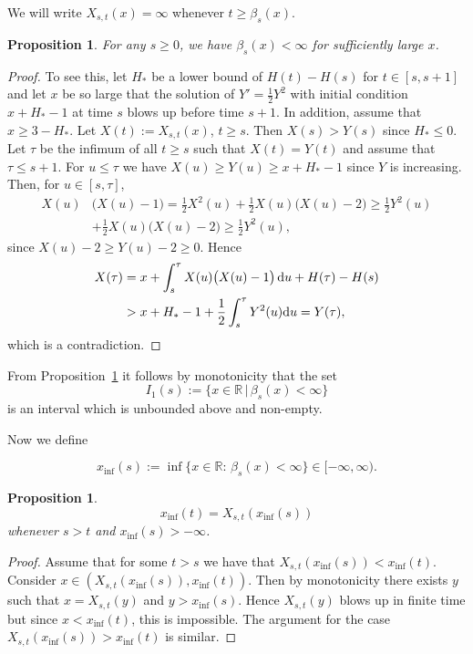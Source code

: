 \documentclass[sn-mathphys-num]{sn-jnl}
\newtheorem{prp}[thm]{Proposition}
\theoremstyle{definition}
\newcommand{\scr}[1]{\mathscr #1}
\numberwithin{equation}{section} \theoremstyle{remark}
\renewcommand{\d}{\hbox{d}}
\def\R{\mathbb R}
\def\d{\text{\rm{d}}} \def\bb{\beta} \def\aa{\alpha} \def\D{\scr D}
\newcommand{\1}{\mathbbm{1}}
\begin{document}
We will write $X_{s,t}(x)=\infty$ whenever $t \geq \beta_s(x)$.


\begin{prp}\label{bfinite}
  For any $s \geq 0$, we have $\beta_s(x)<\infty$ for sufficiently
  large $x$.
\end{prp}
\begin{proof}
  To see this, let $H_*$ be a lower bound of $H(t)-H(s)$ for
  $t \in [s,s+1]$ and let $x$ be so large that the solution of
  $Y'=\frac 12 Y^2$ with initial condition $x+H_*-1$ at time $s$ blows
  up before time $s+1$. In addition, assume that $x\geq 3-H_*$. Let
  $X(t):=X_{s ,t}(x)$, $t \geq s$. Then $X(s)> Y(s)$ since
  $H_*\leq 0$. Let $\tau$ be the infimum of all $t \geq s$ such that
  $X(t)=Y(t)$ and assume that $\tau \leq s+1$. For $u\leq \tau$ we
  have $X(u)\geq Y(u)\geq x+H_*-1$ since $Y$ is increasing.  Then, for
  $u \in [s,\tau]$,
\begin{align*}
X(u) & \big(X(u)-1\big)=\frac 12 X^2(u)+\frac 12
       X(u)\big(X(u)-2\big)\geq \frac 12 Y^2(u)\\
  & +\frac 12 X(u)\big(X(u)-2\big)\geq \frac 12 Y^2(u),
\end{align*}
since $X(u)-2\geq Y(u)-2 \geq 0$. Hence
\begin{align*}
  X(\tau) & =x+\int_s^\tau X(u)\big(X(u)-1\big)\,\d u +H(\tau)-H(s)\\
  & > x+H_* -1 +\frac 12 \int_
s^\tau Y^2(u)\d u =Y(\tau),
\end{align*}
which is a contradiction.
\end{proof}

From Proposition~\ref{bfinite} it follows by monotonicity that the set
\begin{equation} \label{I1s}
  I_1(s) := \{ x\in \R \, | \, \beta_s(x)<\infty\}
\end{equation}  
is an interval which is unbounded above and non-empty.



Now we define 

$$
x_{\inf}(s):=\inf\{x \in \R:\,\beta_s(x)<\infty\}\in [-\infty,\infty).
$$

\begin{prp}\label{Rsoln} 
  \[
    x_{\inf}(t) = X_{s,t} ( x_{\inf} (s) )
  \]
  whenever $s>t$ and $x_{\inf}(s)>-\infty$.  
\end{prp}

\begin{proof}
  Assume that for some $t > s$ we have that
  $ X_{s,t} ( x_{\inf} (s) ) < x_{\inf}(t)$. Consider
  $x \in ( X_{s,t} ( x_{\inf} (s) ), x_{\inf}(t))$. Then by
  monotonicity there exists $y$ such that $x=X_{s,t}(y)$ and
  $y> x_{\inf}(s)$. Hence $X_{s,t}(y)$ blows up in finite time but
  since $x < x_{\inf}(t)$, this is impossible. The argument for the
  case $ X_{s,t} ( x_{\inf} (s) ) > x_{\inf}(t)$ is similar.
\end{proof}  
\end{document}
